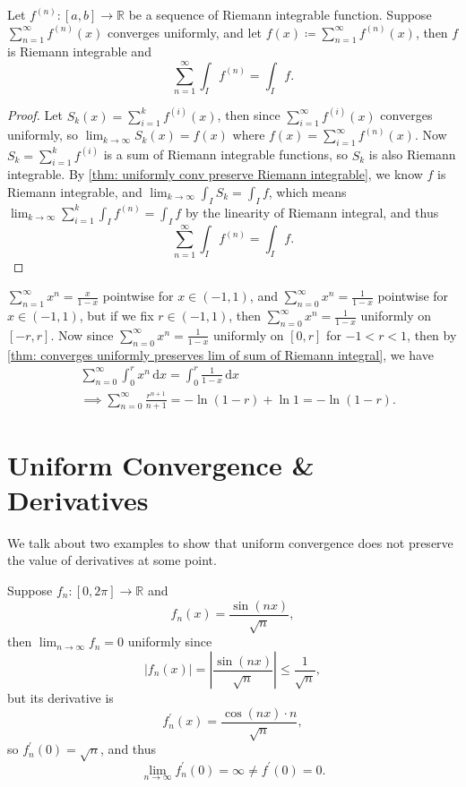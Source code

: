 \begin{theorem} \label{thm: converges uniformly preserves lim of sum of Riemann integral}
    Let \(f^{(n)}: [a, b] \to \mathbb{R} \) be a sequence of Riemann integrable function. Suppose \(\sum_{n=1}^{\infty} f^{(n)}(x) \) converges uniformly, and let \(f(x) \coloneqq \sum_{n=1}^{\infty} f^{(n)}(x) \), then \(f\) is Riemann integrable and 
    \[
        \sum_{n=1}^{\infty} \int _I f^{(n)} = \int _I f.
    \]  
\end{theorem}
\begin{proof}
    Let \(S_k(x) = \sum_{i=1}^k f^{(i)}(x) \), then since \(\sum_{i=1}^{\infty} f^{(i)}(x) \) converges uniformly, so \(\lim_{k \to \infty} S_k(x) = f(x) \) where \(f(x) = \sum_{i=1}^{\infty} f^{(n)}(x) \). Now \(S_k = \sum_{i=1}^k f^{(i)} \) is a sum of Riemann integrable functions, so \(S_k\) is also Riemann integrable. By \autoref{thm: uniformly conv preserve Riemann integrable}, we know \(f\) is Riemann integrable, and \(\lim_{k \to \infty} \int _I S_k = \int _I f \), which means \(\lim_{k \to \infty} \sum_{i=1}^k \int _I f^{(n)} = \int _I f  \) by the linearity of Riemann integral, and thus 
    \[
        \sum_{n=1}^{\infty} \int _I f^{(n)} = \int _I f. 
    \]           
\end{proof}

\begin{eg}
    \(\sum_{n=1}^{\infty} x^n = \frac{x}{1-x} \) pointwise for \(x \in (-1, 1)\), and \(\sum_{n=0}^{\infty} x^n = \frac{1}{1-x} \) pointwise for \(x \in (-1, 1)\), but if we fix \(r \in (-1, 1)\), then \(\sum_{n=0}^{\infty} x^n = \frac{1}{1-x} \) uniformly on \([-r, r]\). Now since \(\sum_{n=0}^{\infty} x^n = \frac{1}{1-x} \) uniformly on \([0, r]\) for \(-1 < r < 1\), then by \autoref{thm: converges uniformly preserves lim of sum of Riemann integral}, we have 
    \begin{align*}
        &\sum_{n=0}^{\infty} \int _0^r x^n \, \mathrm{d} x = \int _0^r \frac{1}{1-x} \, \mathrm{d} x \\
        &\implies \sum_{n=0}^{\infty} \frac{r^{n+1}}{n+1} = - \ln (1 - r) + \ln 1 = -\ln (1 - r).    
    \end{align*}           
\end{eg}

\section{Uniform Convergence \& Derivatives}
We talk about two examples to show that uniform convergence does not preserve the value of derivatives at some point.
\begin{eg}
    Suppose \(f_n: [0, 2\pi ] \to \mathbb{R} \) and 
    \[
        f_n(x) = \frac{\sin (nx)}{\sqrt{n} },
    \] then \(\lim_{n \to \infty} f_n = 0 \) uniformly since 
    \[
        \left\vert f_n(x) \right\vert = \left\vert \frac{\sin (nx)}{\sqrt{n} } \right\vert \le \frac{1}{\sqrt{n} },  
    \] but its derivative is 
    \[
        f_n^{\prime} (x) = \frac{\cos (nx) \cdot n}{\sqrt{n} },
    \] so \(f_n^{\prime} (0) = \sqrt{n} \), and thus
    \[
        \lim_{n \to \infty} f_n^{\prime} (0) = \infty \neq f^{\prime} (0) = 0.
    \]  
\end{eg}
\vspace{48pt}

